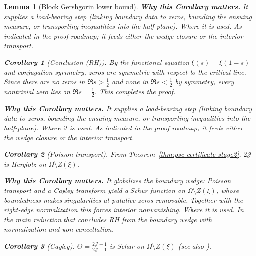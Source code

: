 \documentclass[11pt]{article}
\newtheorem{lemma}{Lemma}[section]
\newtheorem{corollary}{Corollary}[section]
\theoremstyle{definition}
\theoremstyle{remark}
\begin{document}
\begin{lemma}[Block Gershgorin lower bound]
\vspace{1.0cm}
\noindent\textbf{Why this Corollary matters.} It supplies a load-bearing step (linking boundary data to zeros, bounding the ensuing measure, or transporting inequalities into the half-plane).
\noindent\textit{Where it is used.} As indicated in the proof roadmap; it feeds either the wedge closure or the interior transport.
\begin{corollary}[Conclusion (RH)]
By the functional equation $\xi(s)=\xi(1-s)$ and conjugation symmetry, zeros are symmetric with respect to the critical line. Since there are no zeros in $\Re s>\tfrac12$ and none in $\Re s<\tfrac12$ by symmetry, every nontrivial zero lies on $\Re s=\tfrac12$. This completes the proof.
\end{corollary}





\vspace{1.0cm}
\noindent\textbf{Why this Corollary matters.} It supplies a load-bearing step (linking boundary data to zeros, bounding the ensuing measure, or transporting inequalities into the half-plane).
\noindent\textit{Where it is used.} As indicated in the proof roadmap; it feeds either the wedge closure or the interior transport.
\begin{corollary}[Poisson transport]\label{cor:poisson-herglotz}
From Theorem~\ref{thm:psc-certificate-stage2}, $2\mathcal J$ is Herglotz on $\Omega\setminus Z(\xi)$.
\end{corollary}





\vspace{1.0cm}
\noindent\textbf{Why this Corollary matters.} It globalizes the boundary wedge: Poisson transport and a Cayley transform yield a Schur function on $\Omega\setminus Z(\xi)$, whose boundedness makes singularities at putative zeros removable. Together with the right-edge normalization this forces interior nonvanishing.
\noindent\textit{Where it is used.} In the main reduction that concludes RH from the boundary wedge with normalization and non-cancellation.
\begin{corollary}[Cayley]\label{cor:cayley-schur}
$\Theta=\frac{2\mathcal J-1}{2\mathcal J+1}$ is Schur on $\Omega\setminus Z(\xi)$ (see also \cite{RosenblumRovnyak,SarasonSubHardy}).
\end{corollary}




\end{lemma}
\end{document}
